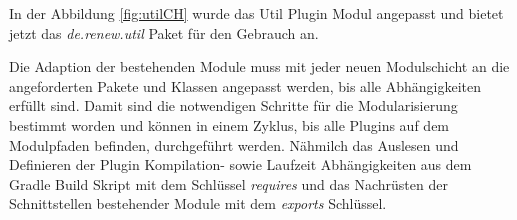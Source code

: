 	In der Abbildung \ref{fig:utilCH} wurde das Util Plugin Modul angepasst und bietet jetzt das \textit{de.renew.util}  Paket für den Gebrauch an.\bigbreak

	Die Adaption der bestehenden Module muss mit jeder neuen Modulschicht an die angeforderten Pakete und Klassen angepasst werden, bis alle Abhängigkeiten erfüllt sind. \newline
	Damit sind die notwendigen Schritte für die Modularisierung bestimmt worden und können in einem Zyklus, bis alle Plugins auf dem Modulpfaden befinden, durchgeführt werden. Nähmilch das Auslesen und Definieren der Plugin Kompilation- sowie Laufzeit Abhängigkeiten aus dem Gradle Build Skript mit dem Schlüssel \textit{requires} und das Nachrüsten der Schnittstellen bestehender Module mit dem \textit{exports} Schlüssel. \bigbreak

